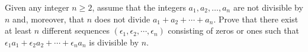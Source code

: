 Given any integer $n \geq 2$, assume that the integers $a_1, a_2, \ldots, a_n$ are not divisible by $n$ and, moreover, that $n$ does not divide $a_1 + a_2 + \cdots + a_n$. Prove that there exist at least $n$ different sequences $(\epsilon_1, \epsilon_2, \cdots, \epsilon_n)$ consisting of zeros or ones such that $\epsilon_1 a_1 + \epsilon_2 a_2 + \cdots + \epsilon_n a_n$ is divisible by $n$.
